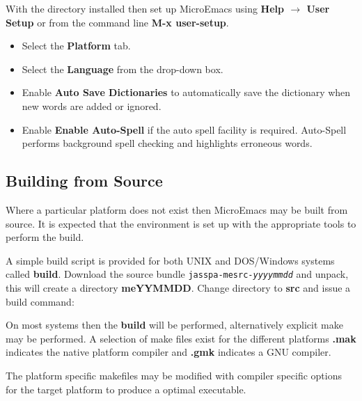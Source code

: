 \documentclass[11pt,a4paper,pdftex]{article}
\begin{document}
  With the directory installed then set up MicroEmacs using \textbf{Help
  $\rightarrow$ User Setup} or from the command line \textbf{M-x user-setup}.

  \begin{itemize}
    \item Select the \textbf{Platform} tab.

    \item Select the \textbf{Language} from the drop-down box.

    \item Enable \textbf{Auto Save Dictionaries} to automatically save the
    dictionary when new words are added or ignored.

    \item Enable \textbf{Enable Auto-Spell} if the auto spell facility is
    required. Auto-Spell performs background spell checking and highlights
    erroneous words.

  \end{itemize}

\subsection{Building from Source}

  Where a particular platform does not exist then MicroEmacs may be built from
  source. It is expected that the environment is set up with the appropriate
  tools to perform the build.

  A simple build script is provided for both UNIX and DOS/Windows systems
  called \textbf{build}. Download the source bundle
  \texttt{jasspa-mesrc-\textit{yyyymmdd}} and unpack, this will create a
  directory \textbf{meYYMMDD}. Change directory to \textbf{src} and issue a
  build command:



  On most systems then the \textbf{build} will be performed, alternatively
  explicit make may be performed. A selection of make files exist for the
  different platforms \textbf{.mak} indicates the native platform compiler and
  \textbf{.gmk} indicates a GNU compiler.


  The platform specific makefiles may be modified with compiler specific
  options for the target platform to produce a optimal executable.
\end{document}
